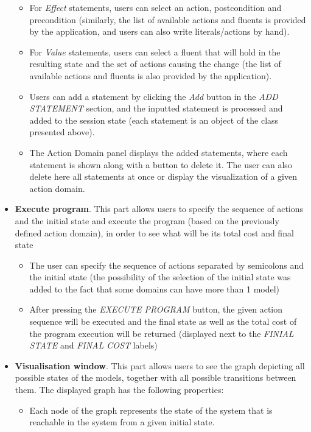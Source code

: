 \documentclass[a4paper]{article}
\begin{document}
\begin{itemize}
\begin{itemize}
        \item For \textit{Effect} statements, users can select an action, postcondition and precondition (similarly, the list of available actions and fluents is provided by the application, and users can also write literals/actions by hand). 
        \item For \textit{Value} statements, users can select a fluent that will hold in the resulting state and the set of actions causing the change (the list of available actions and fluents is also provided by the application).
        \item Users can add a statement by clicking the \textit{Add} button in the \textit{ADD STATEMENT} section, and the inputted statement is processed and added to the session state (each statement is an object of the class presented above).
        \item The Action Domain panel displays the added statements, where each statement is shown along with a button to delete it. The user can also delete here all statements at once or display the visualization of a given action domain.
   \end{itemize}
       \item \textbf{Execute program}. This part allows users to specify the sequence of actions and the initial state and execute the program (based on the previously defined action domain), in order to see what will be its total cost and final state
   \begin{itemize}
        \item The user can specify the sequence of actions separated by semicolons and the initial state (the possibility of the selection of the initial state was added to the fact that some domains can have more than 1 model)
        \item After pressing the \textit{EXECUTE PROGRAM} button, the given action sequence will be executed and the final state as well as the total cost of the program execution will be returned (displayed next to the \textit{FINIAL STATE} and \textit{FINAL COST} labels)
    \end{itemize}
   \item \textbf{Visualisation window}. This part allows users to see the graph depicting all possible states of the models, together with all possible transitions between them. The displayed graph has the following properties: 
   \begin{itemize}
        \item Each node of the graph represents the state of the system that is reachable in the system from a given initial state.

\end{itemize}
\end{itemize}
\end{document}
